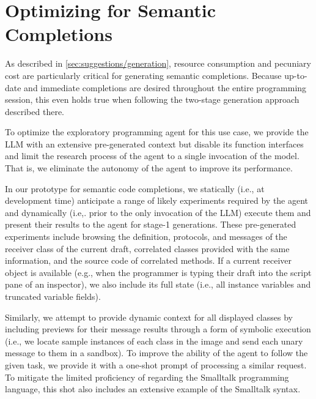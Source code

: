 
\section{Optimizing for Semantic Completions}
\label{sec:agent/completions}

As described in \cref{sec:suggestions/generation}, resource consumption and pecuniary cost are particularly critical for generating semantic completions.
Because up-to-date and immediate completions are desired throughout the entire programming session, this even holds true when following the two-stage generation approach described there.

To optimize the exploratory programming agent for this use case, we provide the LLM with an extensive pre-generated context but disable its function interfaces and limit the research process of the agent to a single invocation of the model.
That is, we eliminate the autonomy of the agent to improve its performance. %

In our prototype for semantic code completions, we statically (i.e., at development time) anticipate a range of likely experiments required by the agent and dynamically (i.e,. prior to the only invocation of the LLM) execute them and present their results to the agent for stage-1 generations.
These pre-generated experiments include browsing the definition, protocols, and messages of the receiver class of the current draft, correlated classes provided with the same information, and the source code of correlated methods.
If a current receiver object is available (e.g., when the programmer is typing their draft into the script pane of an inspector), we also include its full state (i.e., all instance variables and truncated variable fields).

Similarly, we attempt to provide dynamic context for all displayed classes by including previews for their message results through a form of symbolic execution (i.e., we locate sample instances of each class in the image and send each unary message to them in a sandbox). %
To improve the ability of the agent to follow the given task, we provide it with a one-shot prompt of processing a similar request.
To mitigate the limited proficiency of \gptfouro regarding the Smalltalk programming language, this shot also includes an extensive example of the Smalltalk syntax.

